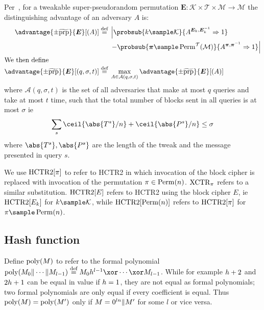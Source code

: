 \documentclass[hctr2.tex]{subfiles}
\begin{document}
Per~\cite{cmc}, for a tweakable super-pseudorandom permutation
$\bm{E} : \mathcal{K} \times \mathcal{T} \times \mathcal{M} \rightarrow \mathcal{M}$
the distinguishing advantage of an adversary $A$ is:
%
\begin{align*}
    \advantage{\pm \widetilde{\mathrm{prp}}}{\bm{E}}[(A)] \defeq
    {}&\left\lvert\probsub{k \sample \mathcal{K}}{A^{\bm{E}_k,\bm{E}_k^{-1}}\Rightarrow 1}\right.
    \\
    {}&\left. - \probsub{\bm{\pi} \sample \Perm^\mathcal{T}(\mathcal{M})}
        {A^{\bm{\pi},\bm{\pi}^{-1}}\Rightarrow 1}\right\rvert
    \\
    \intertext{We then define}
    \advantage{\pm \widetilde{\mathrm{prp}}}{\bm{E}}[(q, \sigma, t)]
    \defeq {}&
    \max_{A \in \mathcal{A}(q, \sigma, t)} \advantage{\pm \widetilde{\mathrm{prp}}}{\bm{E}}[(A)]
\end{align*}
where \(\mathcal{A}(q, \sigma, t)\)
is the set of all adversaries 
that make at most \(q\) queries
and take at most \(t\) time,
such that the total number of blocks sent in all queries is
at most \(\sigma\) ie
\begin{displaymath}
    \sum_s \ceil{\abs{T^s}/n} + \ceil{\abs{P^s}/n} \leq \sigma
\end{displaymath}
where \(\abs{T^s}, \abs{P^s}\) are the length of the tweak and the message presented in query \(s\).

We use \(\operatorname{HCTR2}[\pi]\) to refer to HCTR2 in which invocation
of the block cipher is replaced with invocation of the
permutation \(\pi \in \operatorname{Perm}(n)\).
\(\operatorname{XCTR}_\pi\) refers to a similar substitution.
\(\operatorname{HCTR2}[E]\) refers to HCTR2 using the block cipher \(E\),
ie \(\operatorname{HCTR2}[E_k]\) for \(k \sample \mathcal{K}\), while
\(\operatorname{HCTR2}[\operatorname{Perm}(n)]\) refers to \(\operatorname{HCTR2}[\pi]\)
for \(\pi \sample \Perm(n)\).

\subsection{Hash function}\label{hproperties}

Define \(\operatorname{poly}(M)\) to refer to the formal polynomial
\(\poly(M_0 \Concat \cdots \Concat M_{l-1})
\defeq  M_0\hpoly^{l-1} \xor \cdots \xor M_{l-1}\).
While for example \(h + 2\) and \(2h + 1\) can be equal
in value if \(h = 1\),
they are not equal as formal polynomials;
two formal polynomials are only equal
if every coefficient is equal. Thus \(\operatorname{poly}(M) = \operatorname{poly}(M')\)
only if \(M = 0^{ln} \Vert M'\) for some \(l\) or vice versa.
\end{document}
